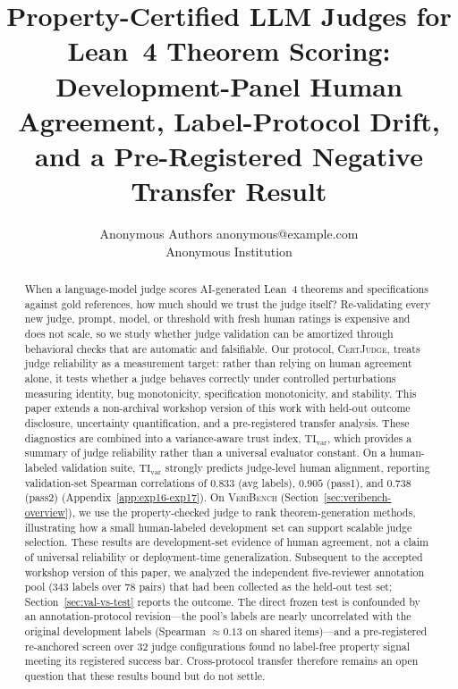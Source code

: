 \documentclass{article}
\title{Property-Certified LLM Judges for Lean~4 Theorem Scoring: Development-Panel Human Agreement, Label-Protocol Drift, and a Pre-Registered Negative Transfer Result}
\author{\name Anonymous Authors \email anonymous@example.com \\
  \addr Anonymous Institution}
\begin{document}
\maketitle
\begin{abstract}
  When a language-model judge scores AI-generated Lean~4 theorems and specifications against gold references, how much should we trust the judge itself? Re-validating every new judge, prompt, model, or threshold with fresh human ratings is expensive and does not scale, so we study whether judge validation can be amortized through behavioral checks that are automatic and falsifiable. Our protocol, \textsc{CertJudge}, treats judge reliability as a measurement target: rather than relying on human agreement alone, it tests whether a judge behaves correctly under controlled perturbations measuring identity, bug monotonicity, specification monotonicity, and stability. This paper extends a non-archival workshop version of this work with held-out outcome disclosure, uncertainty quantification, and a pre-registered transfer analysis. These diagnostics are combined into a variance-aware trust index, \(\mathrm{TI}_{\mathrm{var}}\), which provides a summary of judge reliability rather than a universal evaluator constant. On a human-labeled validation suite, \(\mathrm{TI}_{\mathrm{var}}\) strongly predicts judge-level human alignment, reporting validation-set Spearman correlations of \(0.833\) (avg labels), \(0.905\) (pass1), and \(0.738\) (pass2) (Appendix~\ref{app:exp16-exp17}). On \textsc{VeriBench} (Section~\ref{sec:veribench-overview}), we use the property-checked judge to rank theorem-generation methods, illustrating how a small human-labeled development set can support scalable judge selection. These results are development-set evidence of human agreement, not a claim of universal reliability or deployment-time generalization. Subsequent to the accepted workshop version of this paper, we analyzed the independent five-reviewer annotation pool (\(343\) labels over \(78\) pairs) that had been collected as the held-out test set; Section~\ref{sec:val-vs-test} reports the outcome. The direct frozen test is confounded by an annotation-protocol revision---the pool's labels are nearly uncorrelated with the original development labels (Spearman \(\approx 0.13\) on shared items)---and a pre-registered re-anchored screen over \(32\) judge configurations found no label-free property signal meeting its registered success bar. Cross-protocol transfer therefore remains an open question that these results bound but do not settle.


\end{abstract}
\end{document}
